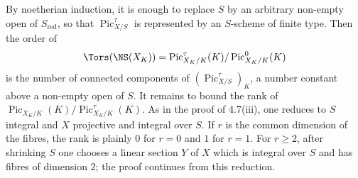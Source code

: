 \documentclass[11pt]{article}
\providecommand{\Pic}{\operatorname{Pic}}
\begin{document}
By noetherian induction, it is enough to replace $S$ by an arbitrary non-empty open of $S_{\mathrm{red}}$, so that $\Pic^\tau_{X/S}$ is represented by an $S$-scheme of finite type. Then the order of
\[
\Tors(\NS(X_K))=\Pic^\tau_{X_K/K}(K)/\Pic^0_{X_K/K}(K)
\]
is the number of connected components of $(\Pic^\tau_{X/S})_K$, a number constant above a non-empty open of $S$. It remains to bound the rank of $\Pic_{X_K/K}(K)/\Pic^\tau_{X_K/K}(K)$. As in the proof of 4.7(iii), one reduces to $S$ integral and $X$ projective and integral over $S$. If $r$ is the common dimension of the fibres, the rank is plainly $0$ for $r=0$ and $1$ for $r=1$. For $r\ge2$, after shrinking $S$ one chooses a linear section $Y$ of $X$ which is integral over $S$ and has fibres of dimension $2$; the proof continues from this reduction.
\end{document}
